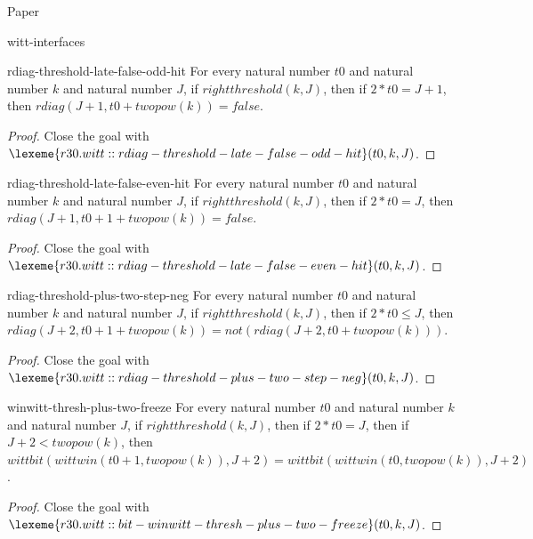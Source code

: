 \begin{lexlean}{Paper}
\begin{section}{witt-interfaces}
  \begin{theorem}{rdiag-threshold-late-false-odd-hit}
  For every natural number \(t0\) and natural number \(k\) and natural number \(J\), if \(rightthreshold(k, J)\), then if \(2 * t0 = J + 1\), then \(rdiag(J + 1, t0 + twopow(k)) = false\).
  \begin{proof}
  Close the goal with \(\lexeme{r30.witt::rdiag-threshold-late-false-odd-hit}(t0, k, J)\).
  \end{proof}
  \end{theorem}

  \begin{theorem}{rdiag-threshold-late-false-even-hit}
  For every natural number \(t0\) and natural number \(k\) and natural number \(J\), if \(rightthreshold(k, J)\), then if \(2 * t0 = J\), then \(rdiag(J + 1, t0 + 1 + twopow(k)) = false\).
  \begin{proof}
  Close the goal with \(\lexeme{r30.witt::rdiag-threshold-late-false-even-hit}(t0, k, J)\).
  \end{proof}
  \end{theorem}

  \begin{theorem}{rdiag-threshold-plus-two-step-neg}
  For every natural number \(t0\) and natural number \(k\) and natural number \(J\), if \(rightthreshold(k, J)\), then if \(2 * t0 ≤ J\), then \(rdiag(J + 2, t0 + 1 + twopow(k)) = not(rdiag(J + 2, t0 + twopow(k)))\).
  \begin{proof}
  Close the goal with \(\lexeme{r30.witt::rdiag-threshold-plus-two-step-neg}(t0, k, J)\).
  \end{proof}
  \end{theorem}

  \begin{theorem}{winwitt-thresh-plus-two-freeze}
  For every natural number \(t0\) and natural number \(k\) and natural number \(J\), if \(rightthreshold(k, J)\), then if \(2 * t0 = J\), then if \(J + 2 < twopow(k)\), then \(wittbit(wittwin(t0 + 1, twopow(k)), J + 2) = wittbit(wittwin(t0, twopow(k)), J + 2)\).
  \begin{proof}
  Close the goal with \(\lexeme{r30.witt::bit-winwitt-thresh-plus-two-freeze}(t0, k, J)\).
  \end{proof}
  \end{theorem}


\end{section}
\end{lexlean}
